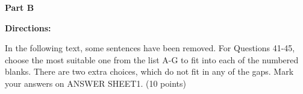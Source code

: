 
\textbf{Part B}

\textbf{Directions:}

In the following text, some sentences have been removed. For Questions 41-45, choose the most suitable one from the list A-G to fit into each of the numbered blanks. There are two extra choices, which do not fit in any of the gaps. Mark your answers on ANSWER SHEET1. (10 points)

\vspace{6pt}